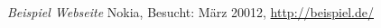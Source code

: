 \begin{thebibliography}{9}

	\emph{Beispiel Webseite}
	Nokia,
	Besucht: M\"arz 20012,
	\url{http://beispiel.de/}
	
\end{thebibliography}